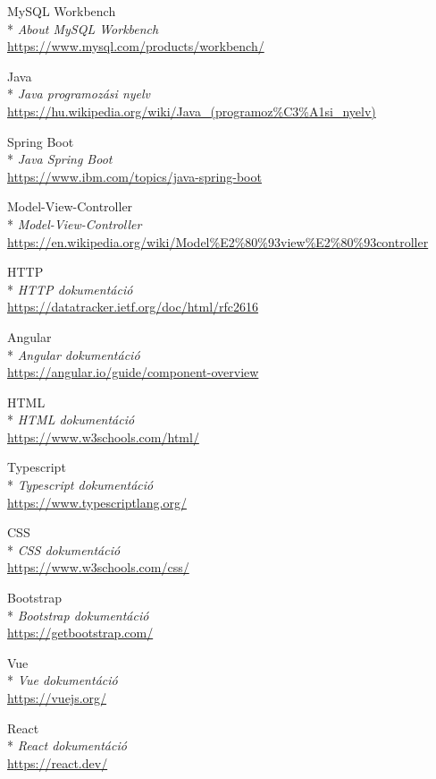 \begin{thebibliography}{x}
 MySQL Workbench\\*
\textit{About MySQL Workbench}
\\ \url{https://www.mysql.com/products/workbench/}

 Java\\*
\textit{Java programozási nyelv}
\\ \url{https://hu.wikipedia.org/wiki/Java_(programoz%C3%A1si_nyelv)}

 Spring Boot\\*
\textit{Java Spring Boot}
\\ \url{https://www.ibm.com/topics/java-spring-boot}

 Model-View-Controller\\*
\textit{Model-View-Controller}
\\ \url{https://en.wikipedia.org/wiki/Model%E2%80%93view%E2%80%93controller}

 HTTP\\*
\textit{HTTP dokumentáció}
\\ \url{https://datatracker.ietf.org/doc/html/rfc2616}

 Angular\\*
\textit{Angular dokumentáció}
\\ \url{https://angular.io/guide/component-overview}

 HTML\\*
\textit{HTML dokumentáció}
\\ \url{https://www.w3schools.com/html/}

 Typescript\\*
\textit{Typescript dokumentáció}
\\ \url{https://www.typescriptlang.org/}

 CSS\\*
\textit{CSS dokumentáció}
\\ \url{https://www.w3schools.com/css/}

 Bootstrap\\*
\textit{Bootstrap dokumentáció}
\\ \url{https://getbootstrap.com/}

 Vue\\*
\textit{Vue dokumentáció}
\\ \url{https://vuejs.org/}

 React\\*
\textit{React dokumentáció}
\\ \url{https://react.dev/}









\end{thebibliography}